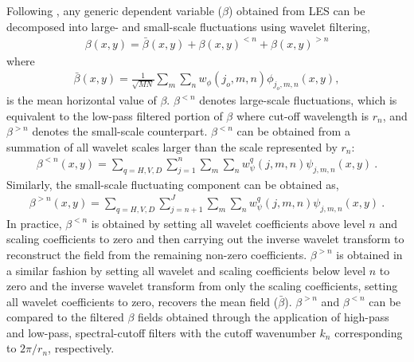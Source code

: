 Following \citet{meneveau_91jfm}, any generic dependent variable ($\beta$) obtained from LES can be decomposed into large- and small-scale fluctuations using wavelet filtering,  
\begin{align}
\beta(x,y) = \bar{\beta}(x,y)+\beta(x,y)^{<n} + \beta(x,y)^{>n}
\label{eqn:wavelet_decompos}
\end{align}
where 
\begin{align}
\bar{\beta}(x,y)= \frac{1}{\sqrt{MN}}\sum_m \sum_n w^{}_{\phi}(j_o,m,n)\phi_{j_o,m,n}(x, y),
\end{align}
is the mean horizontal value of $\beta$. $\beta^{<n}$ denotes large-scale fluctuations, which is equivalent to the low-pass filtered portion of $\beta$ where cut-off wavelength is $r_n$, and $\beta^{>n}$ denotes the small-scale counterpart. $\beta^{<n}$ can be obtained from a summation of all wavelet scales larger than the scale represented by $r_n$: 
\begin{align}
 \beta^{<n}(x,y) = \sum_{q=H,V,D} \sum_{j=1}^n  \sum_m \sum_n w^{q}_{\psi}(j,m,n)\psi_{j,m,n}(x, y)\ .
\end{align}
Similarly, the small-scale fluctuating component can be obtained as,  
\begin{align}
 \beta^{>n}(x,y) = \sum_{q=H,V,D} \sum_{j=n+1}^J  \sum_m \sum_n w^{q}_{\psi}(j,m,n)\psi_{j,m,n}(x, y)\ .
\end{align}
In practice, $\beta^{<n}$ is obtained by setting all wavelet coefficients above level $n$ and scaling coefficients to zero and then carrying out the inverse wavelet transform to reconstruct the field from the remaining non-zero coefficients. $\beta^{>n}$ is obtained in a similar fashion by setting all wavelet and scaling coefficients below level $n$ to zero and the inverse wavelet transform from only the scaling coefficients, setting all wavelet coefficients to zero, recovers the mean field ($\bar{\beta}$). $\beta^{>n}$ and $\beta^{<n}$ can be compared to the filtered $\beta$ fields obtained through the application of high-pass and low-pass, spectral-cutoff filters with the cutoff wavenumber $k_{n}$ corresponding to $2\pi/r_n$, respectively. 

